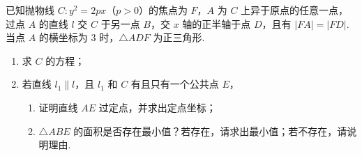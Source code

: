 \begin{problem}
已知抛物线 \(C: y^{2} = 2px\)（\(p > 0\)）的焦点为 \(F\)，\(A\) 为 \(C\) 上异于原点的任意一点，过点 \(A\) 的直线 \(l\) 交 \(C\) 于另一点 \(B\)，交 \(x\) 轴的正半轴于点 \(D\)，且有 \(|FA| = |FD|\). 当点 \(A\) 的横坐标为 3 时，\(\triangle ADF\) 为正三角形.

\begin{enumerate}
\item 求 \(C\) 的方程；
\item 若直线 \(l_{1} \parallel l\)，且 \(l_{1}\) 和 \(C\) 有且只有一个公共点 \(E\)，
\begin{enumerate}
\item 证明直线 \(AE\) 过定点，并求出定点坐标；
\item \(\triangle ABE\) 的面积是否存在最小值？若存在，请求出最小值；若不存在，请说明理由.
\end{enumerate}
\end{enumerate}
\end{problem}

